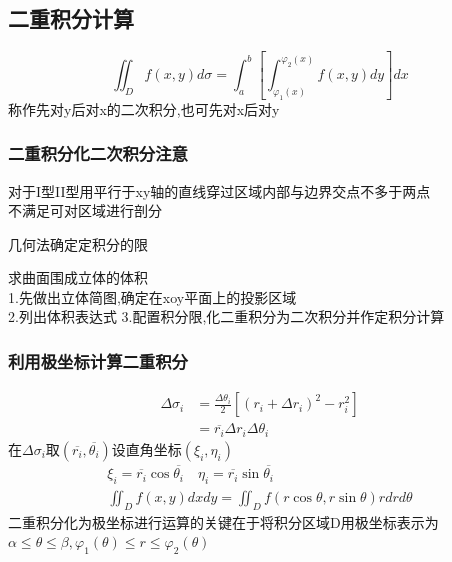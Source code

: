 \documentclass[10pt, a4paper, oneside]{ctexart}
\begin{document}
\begin{sloppypar}
	\subsection{二重积分计算}
	$$
		\iint_{D}f(x,y)d\sigma=\int_{a}^{b}[\int_{\varphi_1(x)}^{\varphi_2(x)}f(x,y)dy]dx
	$$
	称作先对y后对x的二次积分,也可先对x后对y
	\subsubsection{二重积分化二次积分注意}
	对于I型II型用平行于xy轴的直线穿过区域内部与边界交点不多于两点\\
	不满足可对区域进行剖分

	几何法确定定积分的限

	求曲面围成立体的体积\\
	1.先做出立体简图,确定在xoy平面上的投影区域\\
	2.列出体积表达式
	3.配置积分限,化二重积分为二次积分并作定积分计算

	\subsubsection{利用极坐标计算二重积分}
	\begin{align*}
		\Delta\sigma_i & =\frac{\Delta\theta_i}{2}[(r_i+\Delta r_i)^2-r_i^2] \\
		               & =\overline{r_i}\Delta r_i\Delta\theta_i
	\end{align*}
	在$\Delta\sigma_i $取$(\overline{r_i},\overline{\theta_i})$设直角坐标$(\xi_i, \eta_i)$
	\begin{gather*}
		\xi_i=\overline{r_i}\cos\overline{\theta_i}\quad \eta_i=\overline{r_i}\sin\overline{\theta_i}\\
		\iint_{D}f(x,y)dxdy=\iint_{D}f(r\cos\theta, r\sin\theta)rdrd\theta
	\end{gather*}
	二重积分化为极坐标进行运算的关键在于将积分区域D用极坐标表示为$\alpha\leq\theta\leq\beta,\varphi_1(\theta)\leq r \leq\varphi_2(\theta)$


\end{sloppypar}
\end{document}
